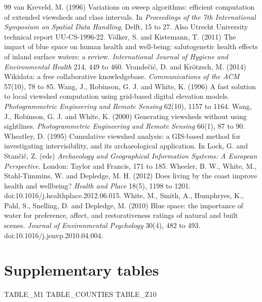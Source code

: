 \begin{thebibliography}{99}
 van Kreveld, M. (1996) Variations on sweep algorithms: efficient computation of extended viewsheds and class intervals. In \textit{Proceedings of the 7th International Symposium on Spatial Data Handling}, Delft, 15 to 27. Also Utrecht University technical report UU-CS-1996-22.
 V\"olker, S. and Kistemann, T. (2011) The impact of blue space on human health and well-being: salutogenetic health effects of inland surface waters: a review. \textit{International Journal of Hygiene and Environmental Health} 214, 449 to 460.
 Vrande\v{c}i\'c, D. and Kr\"otzsch, M. (2014) Wikidata: a free collaborative knowledgebase. \textit{Communications of the ACM} 57(10), 78 to 85.
 Wang, J., Robinson, G. J. and White, K. (1996) A fast solution to local viewshed computation using grid-based digital elevation models. \textit{Photogrammetric Engineering and Remote Sensing} 62(10), 1157 to 1164.
 Wang, J., Robinson, G. J. and White, K. (2000) Generating viewsheds without using sightlines. \textit{Photogrammetric Engineering and Remote Sensing} 66(1), 87 to 90.
 Wheatley, D. (1995) Cumulative viewshed analysis: a GIS-based method for investigating intervisibility, and its archaeological application. In Lock, G. and Stan\v{c}i\v{c}, Z. (eds) \textit{Archaeology and Geographical Information Systems: A European Perspective}. London: Taylor and Francis, 171 to 185.
 Wheeler, B. W., White, M., Stahl-Timmins, W. and Depledge, M. H. (2012) Does living by the coast improve health and wellbeing? \textit{Health and Place} 18(5), 1198 to 1201. doi:10.1016/j.healthplace.2012.06.015.
 White, M., Smith, A., Humphryes, K., Pahl, S., Snelling, D. and Depledge, M. (2010) Blue space: the importance of water for preference, affect, and restorativeness ratings of natural and built scenes. \textit{Journal of Environmental Psychology} 30(4), 482 to 493. doi:10.1016/j.jenvp.2010.04.004.
\end{thebibliography}

\appendix
\section{Supplementary tables}
{{TABLE_M1}}
{{TABLE_COUNTIES}}
{{TABLE_Z10}}


